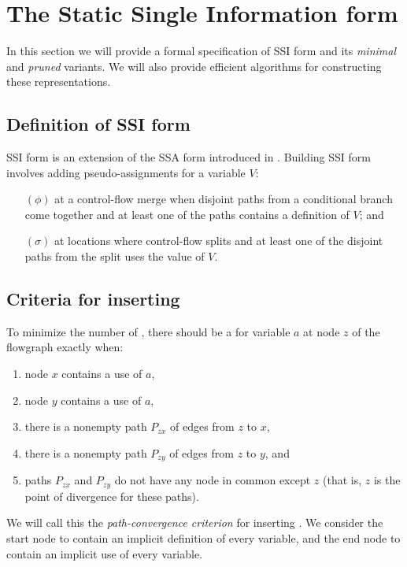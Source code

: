 \section{The Static Single Information form}
In this section we will provide a formal specification of SSI form and
its \emph{minimal} and \emph{pruned} variants.  We will also provide
efficient algorithms for constructing these representations.


\subsection{Definition of SSI form}
SSI form is an extension of the SSA form introduced in \cite{cytron89:ssa}.
Building SSI form involves adding pseudo-assignments for a variable $V$:
\begin{enumerate}
\item[$(\phi)$] at a control-flow merge when disjoint paths from a
conditional branch come together and at least one of the paths
contains a definition of $V$; and
\item[$(\sigma)$] at locations where control-flow splits and at least
one of the disjoint paths from the split uses the value of $V$.
\end{enumerate}

\subsection{Criteria for inserting }
To minimize the number of , there should be a
\sigfunction{} for variable $a$ at node $z$ of the flowgraph exactly
when:
\begin{enumerate}
\item node $x$ contains a use of $a$,
\item node $y$ contains a use of $a$,
\item there is a nonempty path $P_{zx}$ of edges from $z$ to $x$,
\item there is a nonempty path $P_{zy}$ of edges from $z$ to $y$, and
\item paths $P_{zx}$ and $P_{zy}$ do not have any node in common
except $z$ (that is, $z$ is the point of divergence for these paths).
\end{enumerate}
We will call this the \textit{path-convergence criterion} for
inserting .  We consider the start node to contain an
implicit definition of every variable, and the end node to contain an
implicit use of every variable.

